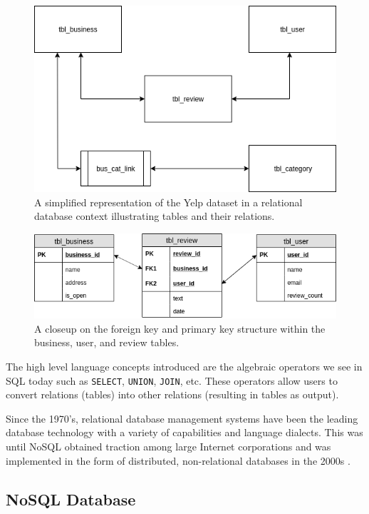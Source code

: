 \begin{figure}[h!]
    \centering
    \includegraphics[width=12cm]{img/relational-database.png}
    \caption{A simplified representation of the Yelp dataset in a relational database context illustrating tables and their relations.}
    \label{fig:relational-database}
\end{figure}

\begin{figure}[h!]
    \centering
    \includegraphics[width=13cm]{img/foreign-key.png}
    \caption{A closeup on the foreign key and primary key structure within the business, user, and review tables.}
    \label{fig:foreign-key}
\end{figure}

The high level language concepts introduced are the algebraic operators we see in SQL today such as \verb|SELECT|, \verb|UNION|, \verb|JOIN|, etc. These operators allow users to convert relations (tables) into other relations (resulting in tables as output).

Since the 1970's, relational database management systems have been the leading database technology with a variety of capabilities and language dialects. This was until NoSQL obtained traction among large Internet corporations and was implemented in the form of distributed, non-relational databases in the 2000s \cite{data-in-nosql}.

\subsection{NoSQL Database}
\label{nosql-database}

